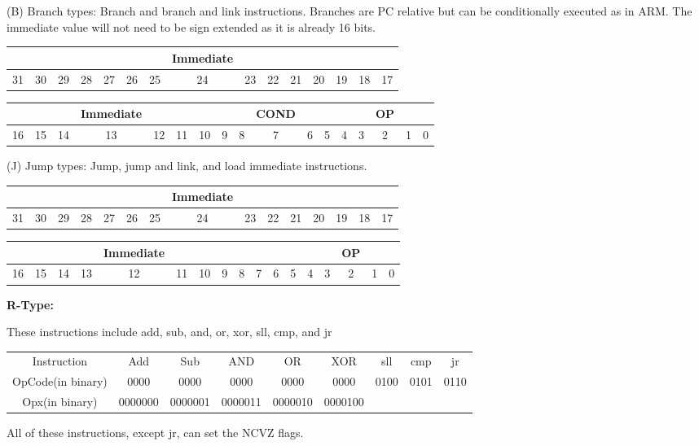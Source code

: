 \documentclass[]{article}
\begin{document}
\noindent (B) Branch types: Branch and branch and link instructions.  Branches are PC relative but can be conditionally executed as in ARM.  The immediate value will not need to be sign extended as it is already 16 bits.

\begin{tabular}{|ccccccccccccccc|}\hline
  &  &  &  &  &  &  & Immediate & &  &  &  & &  &\\\hline
31&30&29&28&27&26&25&24&23&22&21&20&19&18&17\\\hline
\end{tabular}

\begin{tabular}{|cccccccc|cccc|ccccc|}\hline
	&  & & Immediate & &  & & & & COND & & & & & OP & & \\\hline
16&15&14&13&12&11&10&9&8&7&6&5&4&3&2&1&0\\\hline
\end{tabular}

\noindent (J) Jump types: Jump, jump and link, and load immediate instructions.

\begin{tabular}{|ccccccccccccccc|}\hline
  &  &  &  &  &  &  & Immediate & &  &  &  & &  &\\\hline
31&30&29&28&27&26&25&24&23&22&21&20&19&18&17\\\hline
\end{tabular}

\begin{tabular}{|cccccccccccc|ccccc|}\hline
	&  & & & Immediate &  & & & & & & & & & OP & & \\\hline
16&15&14&13&12&11&10&9&8&7&6&5&4&3&2&1&0\\\hline
\end{tabular}

\pagebreak

{\Large
	\textbf{
		R-Type:
	}
}

\noindent These instructions include add, sub, and, or, xor, sll, cmp, and jr

\begin{center}
	\begin{tabular}{|c|c|c|c|c|c|c|c|c|}\cline{1-9}
	Instruction & Add & Sub & AND & OR & XOR & sll & cmp & jr \\\cline{1-9}\hfill
	OpCode(in binary) & 0000 & 0000  & 0000 & 0000 & 0000 & 0100 & 0101 & 0110 \\\cline{1-9}\hfill
	Opx(in binary) & 0000000 & 0000001 & 0000011 & 0000010 & 0000100 &  &  & \\\cline{1-9}
	\end{tabular}
\end{center}
\noindent All of these instructions, except jr, can set the NCVZ flags.
\end{document}
